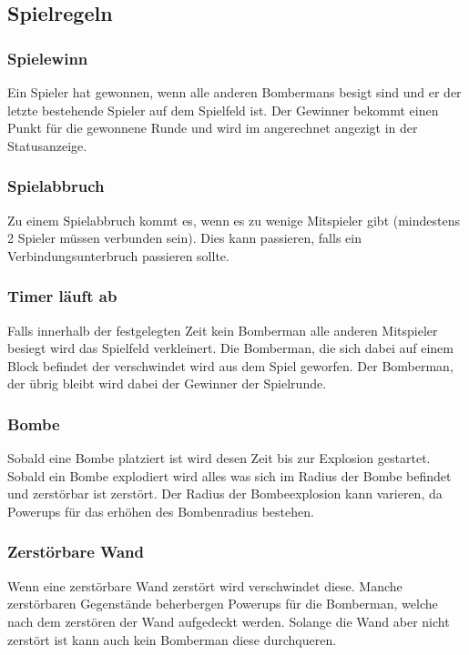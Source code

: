 \documentclass[11pt]{scrartcl}
\begin{document}
\subsection{Spielregeln}
\label{sec:Spielregeln}

\subsubsection{Spielewinn}
\label{sec:Spielgewinn}
Ein Spieler hat gewonnen, wenn alle anderen Bombermans besigt sind und er der letzte bestehende Spieler auf dem Spielfeld ist.
Der Gewinner bekommt einen Punkt für die gewonnene Runde und wird im angerechnet angezigt in der Statusanzeige.

\subsubsection{Spielabbruch}
\label{sec:Spielabbruch}
Zu einem Spielabbruch kommt es, wenn es zu wenige Mitspieler gibt (mindestens 2 Spieler müssen verbunden sein).
Dies kann passieren, falls ein Verbindungsunterbruch passieren sollte.

\subsubsection{Timer läuft ab}
\label{sec:Timer läuft ab}
Falls innerhalb der festgelegten Zeit kein Bomberman alle anderen Mitspieler besiegt wird das Spielfeld verkleinert.
Die Bomberman, die sich dabei auf einem Block befindet der \grqq{}verschwindet\grqq{} wird aus dem Spiel geworfen.
Der Bomberman, der übrig bleibt wird dabei der Gewinner der Spielrunde.

\subsubsection{Bombe}
\label{sec:Bombe}
Sobald eine Bombe platziert ist wird desen \grqq{}Zeit bis zur Explosion gestartet\grqq{}.
Sobald ein Bombe explodiert wird alles was sich im Radius der Bombe befindet und zerstörbar ist zerstört.
Der Radius der Bombeexplosion kann varieren, da Powerups für das erhöhen des Bombenradius bestehen.
\subsubsection{Zerstörbare Wand}
\label{sec:Zerstörbare Wand}
Wenn eine zerstörbare Wand zerstört wird verschwindet diese.
Manche zerstörbaren Gegenstände beherbergen Powerups für die Bomberman, welche nach dem zerstören der Wand aufgedeckt werden.
Solange die Wand aber nicht zerstört ist kann auch kein Bomberman diese durchqueren.
\end{document}

